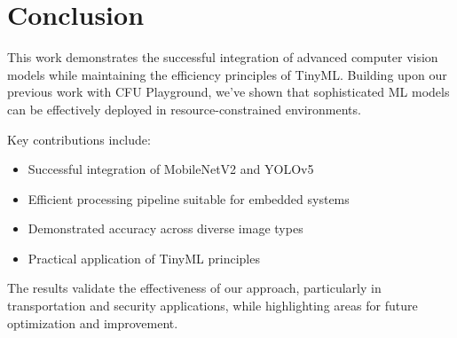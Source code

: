 \documentclass{article}
\begin{document}
\section{Conclusion}
This work demonstrates the successful integration of advanced computer vision models while maintaining the efficiency principles of TinyML. Building upon our previous work with CFU Playground, we've shown that sophisticated ML models can be effectively deployed in resource-constrained environments.

Key contributions include:
\begin{itemize}
    \item Successful integration of MobileNetV2 and YOLOv5
    \item Efficient processing pipeline suitable for embedded systems
    \item Demonstrated accuracy across diverse image types
    \item Practical application of TinyML principles
\end{itemize}

The results validate the effectiveness of our approach, particularly in transportation and security applications, while highlighting areas for future optimization and improvement.
\end{document}
